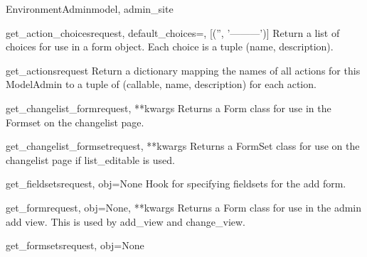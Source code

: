 \documentclass[letterpaper,10pt,english]{sphinxmanual}
\begin{document}
\begin{classdesc}{EnvironmentAdmin}{model, admin\_site}
\hypertarget{data.admin.EnvironmentAdmin.get_action_choices}{}\begin{methoddesc}{get\_action\_choices}{request, default\_choices=, {[}('', '---------'){]}}
Return a list of choices for use in a form object.  Each choice is a
tuple (name, description).
\end{methoddesc}

\hypertarget{data.admin.EnvironmentAdmin.get_actions}{}\begin{methoddesc}{get\_actions}{request}
Return a dictionary mapping the names of all actions for this
ModelAdmin to a tuple of (callable, name, description) for each action.
\end{methoddesc}

\hypertarget{data.admin.EnvironmentAdmin.get_changelist_form}{}\begin{methoddesc}{get\_changelist\_form}{request, **kwargs}
Returns a Form class for use in the Formset on the changelist page.
\end{methoddesc}

\hypertarget{data.admin.EnvironmentAdmin.get_changelist_formset}{}\begin{methoddesc}{get\_changelist\_formset}{request, **kwargs}
Returns a FormSet class for use on the changelist page if list\_editable
is used.
\end{methoddesc}

\hypertarget{data.admin.EnvironmentAdmin.get_fieldsets}{}\begin{methoddesc}{get\_fieldsets}{request, obj=None}
Hook for specifying fieldsets for the add form.
\end{methoddesc}

\hypertarget{data.admin.EnvironmentAdmin.get_form}{}\begin{methoddesc}{get\_form}{request, obj=None, **kwargs}
Returns a Form class for use in the admin add view. This is used by
add\_view and change\_view.
\end{methoddesc}

\hypertarget{data.admin.EnvironmentAdmin.get_formsets}{}\begin{methoddesc}{get\_formsets}{request, obj=None}\end{methoddesc}


\end{classdesc}
\end{document}
